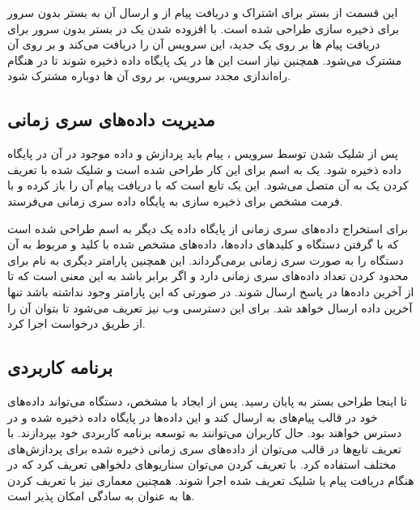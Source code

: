 این قسمت از بستر برای اشتراک و دریافت پیام از   و ارسال آن به بستر بدون سرور برای ذخیره سازی طراحی شده است. با افزوده شدن یک  در بستر بدون سرور برای دریافت پیام ها بر روی یک  جدید، این سرویس آن را دریافت می‌کند و بر روی آن  مشترک می‌شود. همچنین نیاز است این  ها در یک پایگاه داده ذخیره شوند تا در هنگام راه‌اندازی مجدد سرویس، بر روی آن  ها دوباره مشترک شود.

\subsection{مدیریت داده‌های سری زمانی}

پس از شلیک شدن  توسط سرویس ، پیام باید پردازش و داده موجود در آن در پایگاه داده ذخیره شود. یک  به اسم  برای این کار طراحی شده‌ است و  شلیک شده با تعریف کردن یک  به آن متصل می‌شود. این  یک تابع است که با دریافت پیام آن را باز کرده و با فرمت مشخص برای ذخیره سازی به پایگاه داده سری زمانی می‌فرستد.

برای استخراج داده‌های سری زمانی از پایگاه داده یک  دیگر به اسم  طراحی شده است که با گرفتن  دستگاه و کلید‌های داده‌ها، داده‌های مشخص شده با کلید و مربوط به آن دستگاه را به صورت سری زمانی برمی‌گرداند. این  همچنین پارامتر دیگری به نام  برای محدود کردن تعداد داده‌های سری زمانی دارد و اگر برابر  باشد به این معنی است که  تا از آخرین داده‌ها در پاسخ ارسال شوند. در صورتی که این پارامتر وجود نداشته باشد تنها آخرین داده ارسال خواهد شد. برای این  دسترسی وب نیز تعریف می‌شود تا بتوان آن را از طریق درخواست  اجرا کرد.

\subsection{برنامه کاربردی}

تا اینجا طراحی بستر به پایان رسید. پس از ایجاد  با  مشخص، دستگاه می‌تواند داده‌های خود در قالب پیام‌های  به  ارسال کند و این داده‌ها در پایگاه داده ذخیره شده و در دسترس خواهند بود. حال کاربران می‌توانند به توسعه برنامه کاربردی خود بپردازند. با تعریف تابع‌ها در قالب  می‌توان از داده‌های سری زمانی ذخیره شده برای پردازش‌های مختلف استفاده کرد. با تعریف کردن  می‌توان سناریوهای دلخواهی تعریف کرد که در هنگام دریافت پیام یا شلیک  تعریف شده اجرا شوند. همچنین معماری  نیز با تعریف کردن  ها به عنوان  به سادگی امکان پذیر است.

